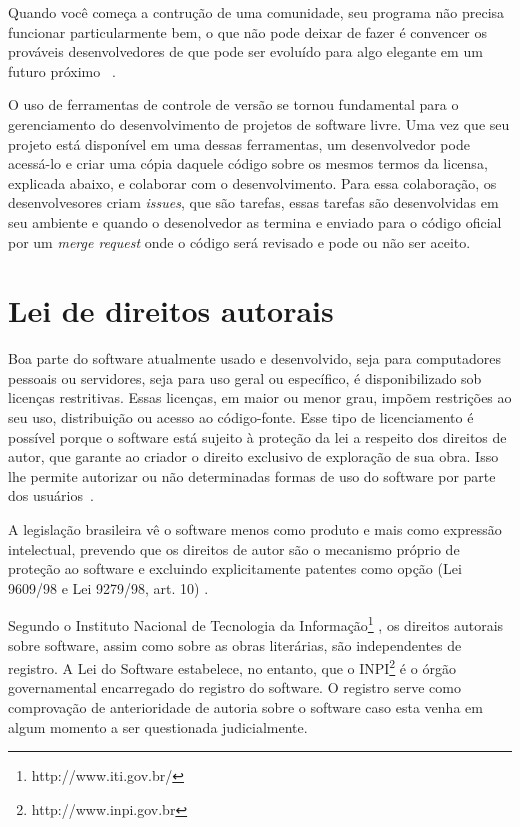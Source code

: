 Quando você começa a contrução de uma comunidade, seu programa não precisa funcionar
particularmente bem, o que não pode deixar de fazer é convencer os prováveis 
desenvolvedores de que pode ser evoluído para algo elegante em um futuro próximo
~\cite{Raymond:1999:CB:580808}.

O uso de ferramentas de controle de versão se tornou fundamental para o gerenciamento
do desenvolvimento de projetos de software livre. Uma vez que seu projeto está 
disponível em uma dessas ferramentas, um desenvolvedor pode acessá-lo e criar
uma cópia daquele código sobre os mesmos termos da licensa, explicada abaixo, e 
colaborar com o desenvolvimento. Para essa colaboração, os desenvolvesores criam
\textit{issues}, que são tarefas, essas tarefas são desenvolvidas em seu ambiente
e quando o desenolvedor as termina e enviado para o código oficial por um 
\textit{merge request} onde o código será revisado e pode ou não ser aceito.


\section{Lei de direitos autorais}

Boa parte do software atualmente usado e desenvolvido, seja para computadores 
pessoais ou servidores, seja para uso geral ou específico, é disponibilizado sob
licenças restritivas. Essas licenças, em maior ou menor grau, impõem restrições 
ao seu uso, distribuição ou acesso ao código-fonte. Esse tipo de licenciamento é 
possível porque o software está sujeito à proteção da lei a respeito dos direitos 
de autor, que garante ao criador o direito exclusivo de exploração de sua obra. 
Isso lhe permite autorizar ou não determinadas formas de uso do software por parte 
dos usuários~\cite{softwarepublico}.

A legislação brasileira vê o software menos como produto e mais como expressão 
intelectual, prevendo que os direitos de autor são o mecanismo próprio de proteção 
ao software e excluindo explicitamente patentes como opção (Lei 9609/98 e Lei 9279/98, art. 10)
\cite{softwarepublico}.

Segundo o Instituto Nacional de Tecnologia da Informação\footnote{http://www.iti.gov.br/}
, os direitos autorais sobre software, assim como sobre as obras literárias, são 
independentes de registro. A Lei do Software estabelece, no entanto, que o INPI\footnote{http://www.inpi.gov.br}
é o órgão governamental encarregado do registro do software. O registro serve 
como comprovação de anterioridade de autoria sobre o software caso esta venha 
em algum momento a ser questionada judicialmente.


